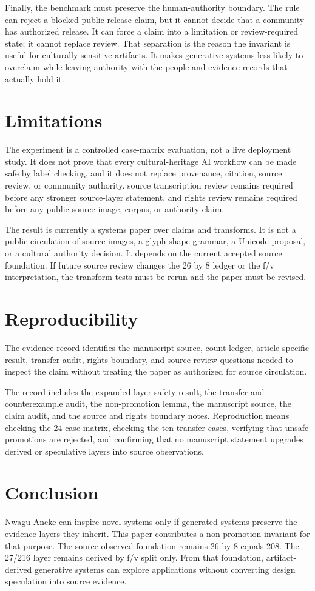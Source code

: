 \documentclass[sigconf,nonacm]{acmart}
\begin{document}
Finally, the benchmark must preserve the human-authority boundary. The rule can
reject a blocked public-release claim, but it cannot decide that a community has
authorized release. It can force a claim into a limitation or review-required
state; it cannot replace review. That separation is the reason the invariant is
useful for culturally sensitive artifacts. It makes generative systems less
likely to overclaim while leaving authority with the people and evidence records
that actually hold it.

\section{Limitations}
The experiment is a controlled case-matrix evaluation, not a live deployment
study. It does not prove that every cultural-heritage AI workflow can be made
safe by label checking, and it does not replace provenance, citation, source
review, or community authority. source transcription review remains required
before any stronger source-layer statement, and rights review remains required
before any public source-image, corpus, or authority claim.

The result is currently a systems paper over claims and
transforms. It is not a public circulation of source images, a glyph-shape grammar,
a Unicode proposal, or a cultural authority decision. It depends on the current
accepted source foundation. If future source review changes the 26 by 8 ledger
or the f/v interpretation, the transform tests must be rerun and the paper must
be revised.

\section{Reproducibility}
The evidence record identifies the manuscript source, count ledger,
article-specific result, transfer audit, rights boundary, and source-review
questions needed to inspect the claim without treating the paper as authorized
for source circulation.

The record includes the expanded layer-safety result, the transfer and
counterexample audit, the non-promotion lemma, the manuscript source, the claim
audit, and the source and rights boundary notes. Reproduction means checking the
24-case matrix, checking the ten transfer cases, verifying that unsafe
promotions are rejected, and confirming that no manuscript statement upgrades
derived or speculative layers into source observations.

\section{Conclusion}
Nwagu Aneke can inspire novel systems only if generated systems preserve the
evidence layers they inherit. This paper contributes a non-promotion invariant
for that purpose. The source-observed foundation remains 26 by 8 equals 208.
The 27/216 layer remains derived by f/v split only. From that foundation,
artifact-derived generative systems can explore applications without converting
design speculation into source evidence.



\end{document}
